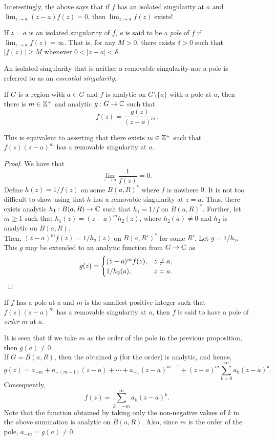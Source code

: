 	Interestingly, the above says that if $f$ has an isolated singularity at $a$ and $\lim_{z \to a} (z-a) f(z) = 0$, then $\lim_{z \to a} f(z)$ exists!

	\begin{fdef}[Pole]
		If $z = a$ is an isolated singularity of $f$, $a$ is said to be a \emph{pole} of $f$ if $\lim_{z \to a} f(z) = \infty$. That is, for any $M > 0$, there exists $\delta > 0$ such that $|f(z)| \ge M$ whenever $0 < |z-a| < \delta$.
	\end{fdef}

	An isolated singularity that is neither a removable singularity nor a pole is referred to as an \emph{essential singularity}.

	\begin{prop}
		If $G$ is a region with $a \in G$ and $f$ is analytic on $G \setminus \{a\}$ with a pole at $a$, then there is $m \in \mathbb{Z}^+$ and analytic $g : G \to \mathbb{C}$ such that
		\[ f(z) = \frac{g(z)}{(z-a)^m}. \]
	\end{prop}
	
	This is equivalent to asserting that there exists $m \in \mathbb{Z}^+$ such that $f(z) (z-a)^m$ has a removable singularity at $a$.

	\begin{proof}
		We have that
		\[ \lim_{z \to a} \frac{1}{f(z)} = 0. \]
		Define $h(z) = 1/f(z)$ on some $B(a,R)^*$ where $f$ is nowhere $0$. It is not too difficult to show using  that $h$ has a removable singularity at $z = a$. Thus, there exists analytic $h_1 : B(a,R) \to \mathbb{C}$ such that $h_1 = 1/f$ on $B(a,R)^*$. Further, let $m \ge 1$ such that $h_1(z) = (z-a)^m h_2(z)$, where $h_2(a) \ne 0$ and $h_2$ is analytic on $B(a,R)$.\\
		Then, $(z-a)^m f(z) = 1/h_2(z)$ on $B(a,R')^*$ for some $R'$. Let $g = 1/h_2$. This $g$ may be extended to an analytic function from $G \to \mathbb{C}$ as
		\[ g(z) = \begin{cases} (z-a)^m f(z), & z \ne a, \\ 1/h_2(a), & z = a. \end{cases} \qedhere \]
	\end{proof}

	\begin{definition}
		If $f$ has a pole at $a$ and $m$ is the smallest positive integer such that $f(z)(z-a)^m$ has a removable singularity at $a$, then $f$ is said to have a pole of \emph{order} $m$ at $a$.
	\end{definition}

	It is seen that if we take $m$ as the order of the pole in the previous proposition, then $g(a) \ne 0$.\\
	If $G = B(a,R)$, then the obtained $g$ (for the order) is analytic, and hence,
	\[ g(z) = a_{-m} + a_{-(m-1)}(z-a) + \cdots + a_{-1} (z-a)^{m-1} + (z-a)^m \sum_{k=0}^\infty a_k (z-a)^k. \]
	Consequently,
	\[ f(z) = \sum_{k = -m}^{\infty} a_k (z-a)^k. \]
	Note that the function obtained by taking only the non-negative values of $k$ in the above summation is analytic on $B(a,R)$. Also, since $m$ is the order of the pole, $a_{-m} = g(a) \ne 0$.

